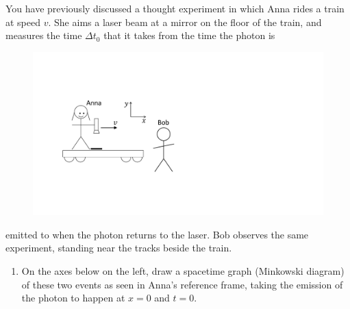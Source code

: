You have previously discussed a thought experiment in which Anna rides a train at speed $v$.  She aims a laser beam at a mirror on the floor of the train, and measures the time $\Delta t_0$ that it takes from the time the photon is 
\begin{figure}
\begin{center}
\vspace{-0.3in}
\includegraphics[scale=0.4]{lorentz_transformations/anna_and_bob.pdf}
\end{center}
\end{figure}
emitted to when the photon returns to the laser.  Bob observes the same experiment, standing near the tracks beside the train.  

\begin{enumerate}[labparts]

\item  
On the axes below on the left, draw a spacetime graph (Minkowski diagram) of these two events as seen in Anna's reference frame, taking the emission of the photon to happen at $x=0$ and $t=0$.
\end{enumerate}

\vspace{0.2in}

